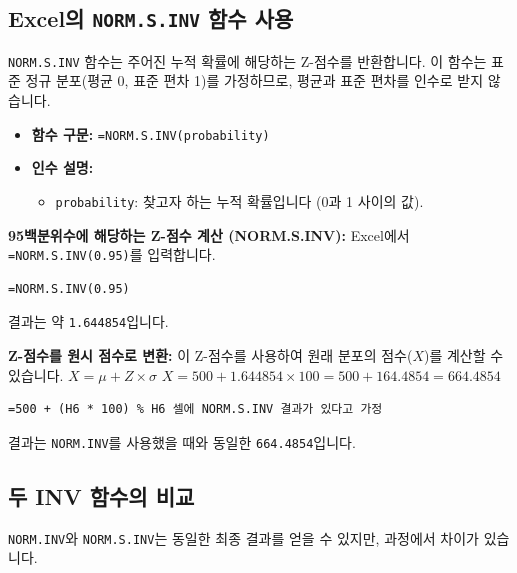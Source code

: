\documentclass[11pt,a4paper]{article}
\theoremstyle{definition}
\begin{document}
\subsection{Excel의 \texttt{NORM.S.INV} 함수 사용}
\texttt{NORM.S.INV} 함수는 주어진 누적 확률에 해당하는 Z-점수를 반환합니다.
이 함수는 표준 정규 분포(평균 0, 표준 편차 1)를 가정하므로, 평균과 표준 편차를 인수로 받지 않습니다.

\begin{itemize}
    \item \textbf{함수 구문:} \texttt{=NORM.S.INV(probability)}
    \item \textbf{인수 설명:}
    \begin{itemize}
        \item \texttt{probability}: 찾고자 하는 누적 확률입니다 (0과 1 사이의 값).
    \end{itemize}
\end{itemize}

\begin{examplebox}
    \textbf{95백분위수에 해당하는 Z-점수 계산 (NORM.S.INV):}
    Excel에서 \texttt{=NORM.S.INV(0.95)}를 입력합니다.
    \begin{lstlisting}[language=Excel, caption={Excel에서 NORM.S.INV 함수 사용 예시}, label={lst:norm_s_inv_example}]
=NORM.S.INV(0.95)
    \end{lstlisting}
    결과는 약 \texttt{1.644854}입니다.

    \textbf{Z-점수를 원시 점수로 변환:}
    이 Z-점수를 사용하여 원래 분포의 점수($X$)를 계산할 수 있습니다.
    $X = \mu + Z \times \sigma$
    $X = 500 + 1.644854 \times 100 = 500 + 164.4854 = 664.4854$
    \begin{lstlisting}[language=Excel, caption={Z-점수를 원시 점수로 변환하는 Excel 수식}, label={lst:z_to_x_formula}]
=500 + (H6 * 100) % H6 셀에 NORM.S.INV 결과가 있다고 가정
    \end{lstlisting}
    결과는 \texttt{NORM.INV}를 사용했을 때와 동일한 \texttt{664.4854}입니다.
\end{examplebox}

\subsection{두 INV 함수의 비교}
\texttt{NORM.INV}와 \texttt{NORM.S.INV}는 동일한 최종 결과를 얻을 수 있지만, 과정에서 차이가 있습니다.
\end{document}
